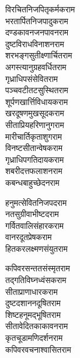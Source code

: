 \begin{large}
\begin{multicols}{2}
विरचितनिजपितृकर्मक\hfill राम\\
भरतार्पितनिजपादुक\hfill राम\\
\jaya
{}
दण्डकावनजनपावन\hfill राम\\
दुष्टविराधविनाशन\hfill राम\\
शरभङ्गसुतीक्ष्णार्चित\hfill राम\\
अगस्त्यानुग्रहवर्धित\hfill राम\\
गृध्राधिपसंसेवित\hfill राम\\
पञ्चवटीतटसुस्थित\hfill राम\\
शूर्पणखार्त्तिविधायक\hfill राम\\
खरदूषणमुखसूदक\hfill राम\\
सीताप्रियहरिणानुग\hfill राम\\
मारीचार्तिकृताशुग\hfill राम\\
विनष्टसीतान्वेषक\hfill राम\\
गृध्राधिपगतिदायक\hfill राम\\
शबरीदत्तफलाशन\hfill राम\\
कबन्धबाहुच्छेदन\hfill राम\\
\jaya

हनुमत्सेवितनिजपद\hfill राम\\
नतसुग्रीवाभीष्टद\hfill राम\\
गर्वितवालिसंहारक\hfill राम\\
वानरदूतप्रेषक\hfill राम\\
हितकरलक्ष्मणसंयुत\hfill राम\\
\jaya

कपिवरसन्ततसंस्मृत\hfill राम\\
तद्गतिविघ्नध्वंसक\hfill राम\\
सीताप्राणाधारक\hfill राम\\
दुष्टदशाननदूषित\hfill राम\\
शिष्टहनूमद्भूषित\hfill राम\\
सीतावेदितकाकावन\hfill राम\\
कृतचूडामणिदर्शन\hfill राम\\
कपिवरवचनाश्वासित\hfill राम\\
\jaya


\end{multicols}
\end{large}
